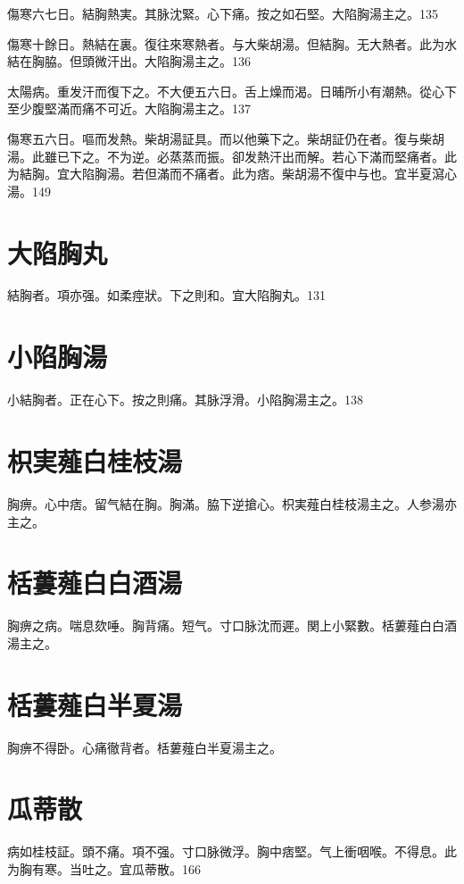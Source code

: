 \documentclass[b5paper,twoside,zihao=-4,UTF8]{ctexbook}
\begin{document}
傷寒六七日。結胸熱実。其脉沈緊。心下痛。按之如石堅。大陷胸湯主之。135

傷寒十餘日。熱結在裏。復往來寒熱者。与大柴胡湯。但結胸。无大熱者。此为水結在胸脇。{但}頭微汗出。大陷胸湯主之。136

太陽病。重发汗而復下之。不大便五六日。舌上燥而渴。日晡所小有潮熱。從心下至少腹堅滿而痛不可近。大陷胸湯主之。137

傷寒五六日。嘔而发熱。柴胡湯証具。而以他藥下之。柴胡証仍在者。復与柴胡湯。此雖已下之。不为逆。必蒸蒸而振。卻发熱汗出而解。若心下滿而堅痛者。此为結胸。宜大陷胸湯。若但滿而不痛者。此为痞。柴胡{湯}不復中与也。宜半夏瀉心湯。149

\section{大陷胸丸}

結胸者。項亦强。如柔痙狀。下之則和。宜大陷胸丸。131

\section{小陷胸湯}

小結胸者。正在心下。按之則痛。其脉浮滑。小陷胸湯主之。138

\section{枳実薤白桂枝湯}

胸痹。心中痞。留气結在胸。胸滿。脇下逆搶心。枳実薤白桂枝湯主之。人参湯亦主之。

\section{栝蔞薤白白酒湯}

胸痹之病。喘息欬唾。胸背痛。短气。寸口脉沈而遲。関上小緊數。栝蔞薤白白酒湯主之。

\section{栝蔞薤白半夏湯}

胸痹不得卧。心痛徹背者。栝蔞薤白半夏湯主之。

\section{瓜蒂散}

病如桂枝証。頭不痛。項不强。寸{口}脉微浮。胸中痞堅。气上衝咽喉。不得息。此为胸有寒。当吐之。宜瓜蒂散。166
\end{document}
